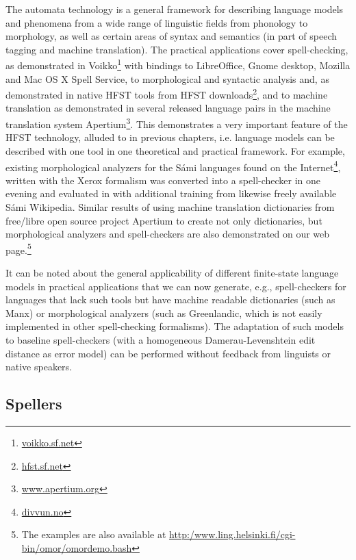 \documentclass{llncs}
\begin{document}
The automata technology is a general framework for describing language models
and phenomena from a wide range of linguistic fields from phonology to
morphology, as well as certain areas of syntax and semantics (in part of speech tagging and
machine translation).  The practical applications cover spell-checking, 
as demonstrated in Voikko\footnote{\url{voikko.sf.net}} with
bindings to LibreOffice, Gnome desktop, Mozilla and Mac OS X Spell Service, to
morphological and syntactic analysis and, as demonstrated in native HFST tools
from HFST downloads\footnote{\url{hfst.sf.net}}, and to machine translation as demonstrated in
several released language pairs in the machine translation system
Apertium\footnote{\url{www.apertium.org}}. This demonstrates a very important feature of the HFST
technology, alluded to in previous chapters, i.e. language models can be
described with one tool in one theoretical and practical framework. For example,
existing morphological analyzers for the Sámi languages found on the
Internet\footnote{\url{divvun.no}}, written with the Xerox formalism was converted into a spell-checker 
in one evening and evaluated in \cite{pirinen/2010/lrec} with additional training from likewise freely
available Sámi Wikipedia. Similar results of using machine translation
dictionaries from free/libre open source project
Apertium to create not only
dictionaries, but morphological analyzers and spell-checkers are also
demonstrated on our web page.\footnote{The examples are also available at
  \url{http:/www.ling.helsinki.fi/cgi-bin/omor/omordemo.bash}}

It can be noted about the general applicability of different finite-state
language models in practical applications that we can now generate,
e.g., spell-checkers for languages that lack such tools but have machine
readable dictionaries (such as Manx) or morphological analyzers (such as
Greenlandic, which is not easily implemented in other spell-checking formalisms). 
The adaptation of such models to baseline spell-checkers (with a homogeneous 
Damerau-Levenshtein edit distance as error model) can be performed without 
feedback from linguists or native speakers.

\subsection{Spellers}
\end{document}
